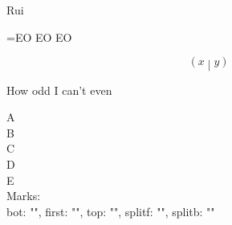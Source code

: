 \documentclass{article}
\begin{document}
{}
\beginR
Rui
\endR
{}



\the\interactionmode
\the\tracingassigns
\the\tracinggroups
\the\tracingifs
\the\tracingscantokens 



\everyeof={EO EO EO}

\[
\left( x \middle\vert y \right)
\]

\def\zahl{3}
\unless\ifodd\zahl
How odd
\else
I can't even
\fi

\newpage

\noindent
A\\
B\\
\newpage
\noindent
C\\
D\\
E\\
Marks:\\
bot: "", first: "", top: "", splitf: "", splitb: ""
\end{document}
